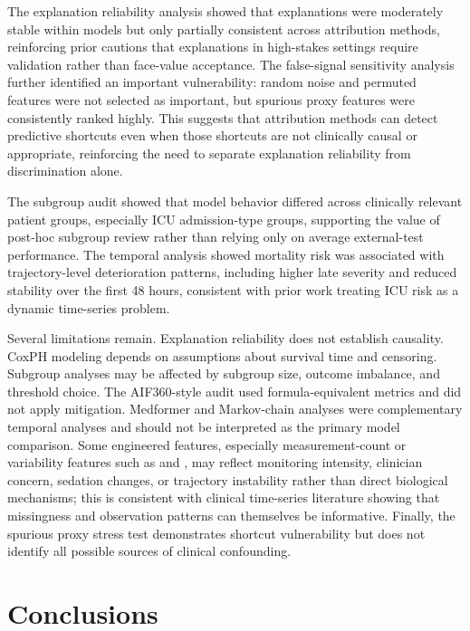 \documentclass[10pt,twocolumn,letterpaper]{article}
\newcommand{\feat}[1]{\texttt{\detokenize{#1}}}
\begin{document}
The explanation reliability analysis showed that explanations were moderately stable within models but only partially consistent across attribution methods, reinforcing prior cautions that explanations in high-stakes settings require validation rather than face-value acceptance\cite{adebayo2018sanity,rudin2019blackbox}. The false-signal sensitivity analysis further identified an important vulnerability: random noise and permuted features were not selected as important, but spurious proxy features were consistently ranked highly. This suggests that attribution methods can detect predictive shortcuts even when those shortcuts are not clinically causal or appropriate, reinforcing the need to separate explanation reliability from discrimination alone\cite{ghassemi2021falsehope,geirhos2020shortcut}.

The subgroup audit showed that model behavior differed across clinically relevant patient groups, especially ICU admission-type groups, supporting the value of post-hoc subgroup review rather than relying only on average external-test performance\cite{bellamy2019aif360,hardt2016equality}. The temporal analysis showed mortality risk was associated with trajectory-level deterioration patterns, including higher late severity and reduced stability over the first 48 hours, consistent with prior work treating ICU risk as a dynamic time-series problem\cite{harutyunyan2019benchmarking,shickel2019deepsofa}.

Several limitations remain. Explanation reliability does not establish causality. CoxPH modeling depends on assumptions about survival time and censoring. Subgroup analyses may be affected by subgroup size, outcome imbalance, and threshold choice. The AIF360-style audit used formula-equivalent metrics and did not apply mitigation. Medformer and Markov-chain analyses were complementary temporal analyses and should not be interpreted as the primary model comparison. Some engineered features, especially measurement-count or variability features such as \feat{PaCO2_count} and \feat{GCS_std}, may reflect monitoring intensity, clinician concern, sedation changes, or trajectory instability rather than direct biological mechanisms; this is consistent with clinical time-series literature showing that missingness and observation patterns can themselves be informative\cite{che2018grud}. Finally, the spurious proxy stress test demonstrates shortcut vulnerability but does not identify all possible sources of clinical confounding.

\section{Conclusions}
\end{document}
